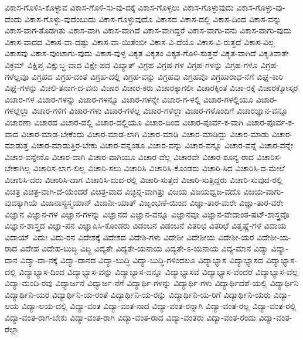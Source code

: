 ವಿಕಾಸ-ಗೊಳಿಸಿ-ಕೊಳ್ಳುವ
ವಿಕಾಸ-ಗೊಳಿ-ಸು-ವು-ದಕ್ಕೆ
ವಿಕಾಸ-ಗೊಳ್ಳಲು
ವಿಕಾಸ-ಗೊಳ್ಳುವುದು
ವಿಕಾಸ-ಗೊಳ್ಳು-ವು-ದೆಂದು
ವಿಕಾಸ-ಗೊಳ್ಳು-ವುದೆಂಬುದು
ವಿಕಾಸ-ಗೊಳ್ಳುವುದೊ
ವಿಕಾಸದ
ವಿಕಾಸ-ದಲ್ಲಿ
ವಿಕಾಸ-ದಿಂದ
ವಿಕಾಸ-ವನ್ನು
ವಿಕಾಸ-ವಾಗ-ತೊಡಗಿತು
ವಿಕಾಸ-ವಾಗಿ
ವಿಕಾಸ-ವಾಗಿದೆ
ವಿಕಾಸ-ವಾಗಿದ್ದರೆ
ವಿಕಾಸ-ವಾಗು-ವನು
ವಿಕಾಸ-ವಾಗು-ವುದು
ವಿಕಾಸ-ವಾದದ
ವಿಕಾಸ-ವಾ-ದಷ್ಟು
ವಿಕಾಸ-ವಾ-ಯಿತೆಂಬೀ
ವಿಕಾಸ-ವಿ-ದೆಯೊ
ವಿಕಾಸ-ವಿ-ರುತ್ತದೆ
ವಿಕಾಸ-ವಿಲ್ಲ
ವಿಕಾಸವು
ವಿಕಾಸ-ವುಂಟಾಗು-ವುದು
ವಿಕಾಸ-ವುಳ್ಳ
ವಿಕೃತ
ವಿಕೃತಂ
ವಿಕೃತ-ಗೊಳಿ-ಸುತ್ತವೆ
ವಿಕೃತ-ವಾಗಿದೆ
ವಿಕೃತಿವಾತೇ
ವಿಕ್ರಮ್
ವಿಕ್ಷಿಪ್ತ
ವಿಕ್ಷುಬ್ಧ-ವಾದ
ವಿಕ್ಷೇ-ಪದ
ವಿಖ್ಯಾತ್
ವಿಗ್ರಹ
ವಿಗ್ರಹ-ಗಳ
ವಿಗ್ರಹ-ಗಳನ್ನು
ವಿಗ್ರಹ-ಗಳೂ
ವಿಗ್ರಹ-ಗಳೆಲ್ಲವೂ
ವಿಗ್ರಹದ
ವಿಗ್ರಹ-ದಂತೆ
ವಿಗ್ರಹ-ದಲ್ಲಿ
ವಿಗ್ರಹ-ವನ್ನು
ವಿಗ್ರಹವು
ವಿಗ್ರಹವೊ
ವಿಗ್ರಹಾರಾಧ-ನೆಗೆ
ವಿಘ್ನ-ಕಾರಿ
ವಿಘ್ನ-ಗಳನ್ನು
ವಿಚಲಿ-ತನಾಗ-ದ-ವನು
ವಿಚಾರ
ವಿಚಾರ-ಕರು
ವಿಚಾರಕ್ಕಾಗಲೀ
ವಿಚಾರಕ್ಕಿಂತ
ವಿಚಾ-ರಕ್ಕೆ
ವಿಚಾರಕ್ಕೋಸ್ಕರ
ವಿಚಾರ-ಗಳ
ವಿಚಾರ-ಗಳನ್ನು
ವಿಚಾರ-ಗಳನ್ನೂ
ವಿಚಾರ-ಗಳನ್ನೇ
ವಿಚಾರ-ಗ-ಳಲ್ಲಿ
ವಿಚಾರ-ಗಳಲ್ಲಿಯೂ
ವಿಚಾರ-ಗಳಲ್ಲೆಲ್ಲಾ
ವಿಚಾರ-ಗಳಿಗೆ
ವಿಚಾರ-ಗಳು
ವಿಚಾರ-ಗಳೆಲ್ಲ
ವಿಚಾರ-ಗಳೆಲ್ಲಾ
ವಿಚಾರ-ಗಳೊಂದಿಗೆ
ವಿಚಾರಜ್ಞಾನ-ವನ್ನೂ
ವಿಚಾರಣಾ
ವಿಚಾರದ
ವಿಚಾರ-ದಲ್ಲಿ
ವಿಚಾರ-ದಲ್ಲಿಯೂ
ವಿಚಾರ-ದಿಂದ
ವಿಚಾರ-ಪೂರ್ವ-ಕ-ವಾಗಿ
ವಿಚಾರ-ಪೂರ್ವ-ಕ-ವಾದ
ವಿಚಾರ-ಮಾಡ-ಬೇಕೆಂದು
ವಿಚಾರ-ಮಾಡ-ಲಾಗಿ
ವಿಚಾರ-ಮಾಡಿ
ವಿಚಾರ-ಮಾಡಿದ್ದು
ವಿಚಾರ-ಮಾಡು
ವಿಚಾರ-ಮಾಡುತ್ತ
ವಿಚಾರ-ಮಾಡುತ್ತಿರ-ಬೇಕು
ವಿಚಾರ-ವನ್ನಂತೂ
ವಿಚಾರ-ವನ್ನು
ವಿಚಾರ-ವನ್ನೂ
ವಿಚಾರ-ವನ್ನೆ
ವಿಚಾರ-ವನ್ನೇ
ವಿಚಾರ-ವನ್ನೇನೊ
ವಿಚಾರ-ವಾಗಿ
ವಿಚಾರ-ವಾಗಿಯೂ
ವಿಚಾರ-ವೆಲ್ಲ
ವಿಚಾರವೇ
ವಿಚಾರ-ಶೂನ್ಯ-ರಾದ
ವಿಚಾರಿಸ-ಬೇಕಾಗಿಲ್ಲ
ವಿಚಾರಿಸ-ಲಾಗ-ಲಿಲ್ಲ
ವಿಚಾರಿ-ಸಲು
ವಿಚಾರಿಸಿ
ವಿಚಾರಿಸಿ-ಕೊಂಡರು
ವಿಚಾರಿ-ಸಿದ
ವಿಚಾರಿಸಿ-ದ-ಮೇಲೆ
ವಿಚಾರಿಸಿ-ದರು
ವಿಚಾರಿಸಿ-ದಾಗ
ವಿಚಾರಿಸಿ-ದುದ-ರಲ್ಲಿ
ವಿಚಾರಿ-ಸುತ್ತದೆ
ವಿಚಾರಿ-ಸುತ್ತಿದ್ದರು
ವಿಚಾರಿ-ಸುವುದ-ರಲ್ಲಿ
ವಿಚಿತ್ರ
ವಿಚಿತ್ರ-ವಾಗಿ-ದೆ-ಯೆಂದರೆ
ವಿಚಿತ್ರ-ವಾದ
ವಿಚ್ಛಿನ್ನ-ವಾಗಿತ್ತು
ವಿಜಯ
ವಿಜಯಧ್ವಜ-ವದೊ
ವಿಜಯ-ವಾಗು-ವುದಕ್ಕಾಗಿಯೆ
ವಿಜಾನಾಸ್ಯಸ್ಮಯಾನ್
ವಿಜಾನೀ-ಯಾತ್
ವಿಜೃಂಭಣೆ-ಯಿಂದ
ವಿಜ್ಞಾ-ತಾರ-ಮರೇ
ವಿಜ್ಞಾ-ತಾರ-ವರೇ
ವಿಜ್ಞಾನ
ವಿಜ್ಞಾನ-ಗಳ
ವಿಜ್ಞಾನ-ಗಳನ್ನು
ವಿಜ್ಞಾನದ
ವಿಜ್ಞಾನ-ವನ್ನೂ
ವಿಜ್ಞಾನವೂ
ವಿಜ್ಞಾನ-ವೇದಾಂತ-ಷಟ್‌-ಶಾಸ್ತ್ರವೊ
ವಿಜ್ಞಾನ-ಶಾಸ್ತ್ರದ
ವಿಜ್ಞಾ-ಪನ
ವಿಜ್ಞಾಪಿಸಿ-ಕೊಂಡರು
ವಿಡಂಬನ
ವಿಡಂಬನೆ
ವಿತರಿಛ
ವಿತರಿಛೆ
ವಿತೃಷ್ಣೆ-ಗಳೆ
ವಿದಾಯ
ವಿದಾಯ್
ವಿದುಃ
ವಿದು-ರನ
ವಿದೇಶಕ್ಕೆ
ವಿದೇಶದ
ವಿದೇಶಿ-ಗಳು
ವಿದೇಶೀ
ವಿದೇಶೀಯ
ವಿದೇಶೀ-ಯರ
ವಿದೇಶೀ-ಯ-ರಾದ
ವಿದೇಹ
ವಿದೇಹ-ಬುದ್ಧಿ
ವಿದ್ಧಿ
ವಿದ್ಯತೇ
ವಿದ್ಯತೇ-ಯನಾಯ
ವಿದ್ಯತೇ-ಽ-ಯನಾಯ
ವಿದ್ಯ-ಮಾನ
ವಿದ್ಯಾ
ವಿದ್ಯಾ-ದಾನ
ವಿದ್ಯಾ-ದಾ-ನಕ್ಕೆ
ವಿದ್ಯಾ-ದಾನದ
ವಿದ್ಯಾ-ಬುದ್ಧಿ
ವಿದ್ಯಾ-ಬುದ್ಧಿ-ಗಳಿಂದಲೂ
ವಿದ್ಯಾಭ್ಯಾಸ
ವಿದ್ಯಾಭ್ಯಾಸದ
ವಿದ್ಯಾಭ್ಯಾಸ-ದಲ್ಲಿ
ವಿದ್ಯಾಭ್ಯಾಸ-ದಿಂದ
ವಿದ್ಯಾಭ್ಯಾಸ-ವನ್ನು
ವಿದ್ಯಾಭ್ಯಾಸ-ವನ್ನೂ
ವಿದ್ಯಾಭ್ಯಾಸವೆ
ವಿದ್ಯಾಭ್ಯಾಸ-ವೆಂದರೆ
ವಿದ್ಯಾಭ್ಯಾಸ-ವೆಲ್ಲ
ವಿದ್ಯಾ-ಮಂದಿ-ರವು
ವಿದ್ಯಾರ್ಜನೆ
ವಿದ್ಯಾರ್ಜ-ನೆಗೆ
ವಿದ್ಯಾರ್ಥಿ-ಗಳನ್ನು
ವಿದ್ಯಾರ್ಥಿ-ಗಳು
ವಿದ್ಯಾರ್ಥಿದೆಶೆ-ಯಲ್ಲಿ
ವಿದ್ಯಾರ್ಥಿನಿ
ವಿದ್ಯಾರ್ಥಿನಿ-ಯರ
ವಿದ್ಯಾರ್ಥಿನಿ-ಯ-ರಂತೆ
ವಿದ್ಯಾರ್ಥಿನಿ-ಯ-ರನ್ನು
ವಿದ್ಯಾರ್ಥಿನಿ-ಯ-ರಿಗೆ
ವಿದ್ಯಾರ್ಥಿನಿ-ಯರು
ವಿದ್ಯಾ-ಲಯ
ವಿದ್ಯಾ-ಲಯ-ದಲ್ಲಿ
ವಿದ್ಯಾ-ವಂತ
ವಿದ್ಯಾ-ವಂತ-ನಾದ
ವಿದ್ಯಾ-ವಂತ-ರನ್ನಾಗಿ
ವಿದ್ಯಾ-ವಂತ-ರಲ್ಲ
ವಿದ್ಯಾ-ವಂತ-ರಲ್ಲಿ
ವಿದ್ಯಾ-ವಂತ-ರಾಗ-ಬೇಕು
ವಿದ್ಯಾ-ವಂತ-ರಾಗಿ
ವಿದ್ಯಾ-ವಂತ-ರಾದ
ವಿದ್ಯಾ-ವಂತರು
ವಿದ್ಯಾ-ವಂತ-ರೆಂದು
ವಿದ್ಯಾ-ವಂತ-ರೆಲ್ಲಾ

